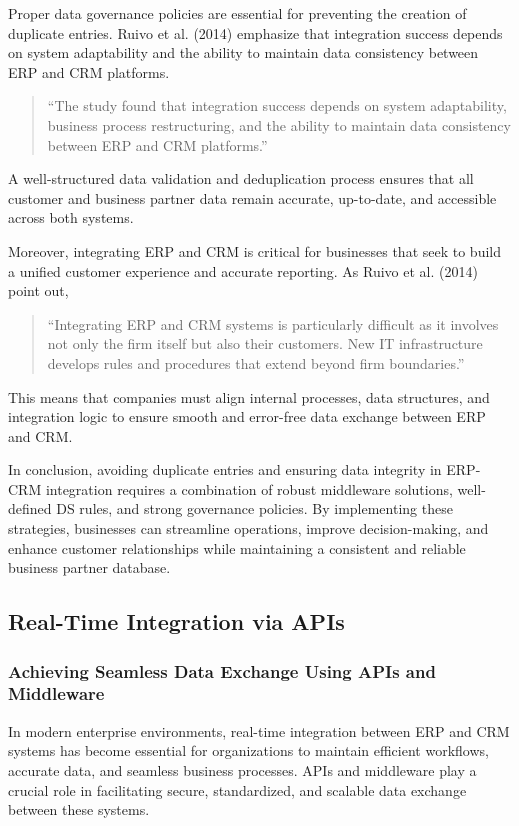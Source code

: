 Proper data governance policies are essential for preventing the creation of duplicate entries. Ruivo et al. (2014) emphasize that integration success depends on system adaptability and the ability to maintain data consistency between ERP and CRM platforms. 
\begin{quote}
    ``The study found that integration success depends on system adaptability, business process restructuring, and the ability to maintain data consistency between ERP and CRM platforms.'' \cite{ruivo2014}
\end{quote}
A well-structured data validation and deduplication process ensures that all customer and business partner data remain accurate, up-to-date, and accessible across both systems.

Moreover, integrating ERP and CRM is critical for businesses that seek to build a unified customer experience and accurate reporting. As Ruivo et al. (2014) point out, 
\begin{quote}
    ``Integrating ERP and CRM systems is particularly difficult as it involves not only the firm itself but also their customers. New IT infrastructure develops rules and procedures that extend beyond firm boundaries.'' \cite{ruivo2014}
\end{quote}
This means that companies must align internal processes, data structures, and integration logic to ensure smooth and error-free data exchange between ERP and CRM.

In conclusion, avoiding duplicate entries and ensuring data integrity in ERP-CRM integration requires a combination of robust middleware solutions, well-defined DS rules, and strong governance policies. By implementing these strategies, businesses can streamline operations, improve decision-making, and enhance customer relationships while maintaining a consistent and reliable business partner database.

\subsection{Real-Time Integration via APIs}
\subsubsection{Achieving Seamless Data Exchange Using APIs and Middleware}

In modern enterprise environments, real-time integration between ERP and CRM systems has become essential for organizations to maintain efficient workflows, accurate data, and seamless business processes. APIs and middleware play a crucial role in facilitating secure, standardized, and scalable data exchange between these systems.


